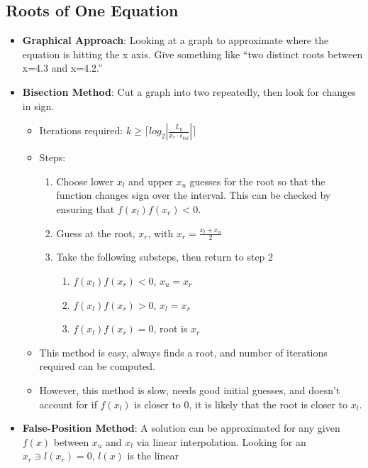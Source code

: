 \documentclass[fontsize=5pt]{scrartcl}
\begin{document}
\begin{multicols}{3}
    \subsection{Roots of One Equation}
      \begin{itemize}
       \item \textbf{Graphical Approach}: Looking at a graph to approximate where the equation is hitting the x axis. Give 
          something like ``two distinct roots between x=4.3 and x=4.2.''
       \item \textbf{Bisection Method}: Cut a graph into two repeatedly, then look for changes in sign.
        \begin{itemize}
          \item Iterations required: $k \geq \lceil log_2|\frac{L_0}{x_r \cdot \epsilon_{tol}}|\rceil$
          \item Steps:
          \begin{enumerate}
              \item Choose lower $x_l$ and upper $x_u$ guesses for the root so that the function changes sign over the
              interval. This can be checked by ensuring that $f(x_l)f(x_r) < 0$.
              \item Guess at the root, $x_r$, with $x_r = \frac{x_l + x_u}{2}$
              \item Take the following substeps, then return to step 2
              \begin{enumerate}
                \item $f(x_l)f(x_r) < 0$, $x_u = x_r$
                \item $f(x_l)f(x_r) > 0$, $x_l = x_r$
                \item $f(x_l)f(x_r) = 0$, root is $x_r$
              \end{enumerate}
          \end{enumerate}
          \item This method is easy, always finds a root, and number of iterations required can be computed.
          \item However, this method is slow, needs good initial guesses, and doesn't account for if $f(x_l)$
            is closer to 0, it is likely that the root is closer to $x_l$.
        \end{itemize}
        \item \textbf{False-Position Method}: A solution can be approximated for any given $f(x)$ between $x_u$
          and $x_l$ via linear interpolation. Looking for an $x_r \ni l(x_r) = 0$, $l(x)$ is the linear

\end{itemize}
\end{multicols}
\end{document}

